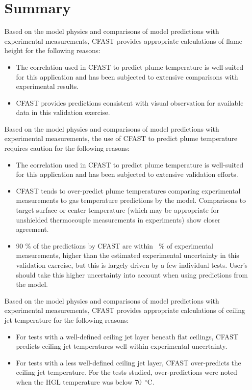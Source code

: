 \section{Summary}

Based on the model physics and comparisons of model predictions with experimental measurements, CFAST provides appropriate calculations of flame height for the following reasons:

\begin{itemize}
\item The correlation used in CFAST to predict plume temperature is well-suited for this application and has been subjected to extensive comparisons with experimental results.
\item CFAST provides predictions consistent with visual observation for available data in this validation exercise.
\end{itemize}

Based on the model physics and comparisons of model predictions with experimental measurements, the use of CFAST to predict plume temperature requires caution for the following reasons:

\begin{itemize}
\item The correlation used in CFAST to predict plume temperature is well-suited for this application and has been subjected to extensive validation efforts.
\item CFAST tends to over-predict plume temperatures comparing experimental measurements to gas temperature predictions by the model.  Comparisons to target surface or center temperature (which may be appropriate for unshielded thermocouple measurements in experiments) show closer agreement.
\item 90 \% of the predictions by CFAST are within \Plumeavg~\% of experimental measurements, higher than the estimated experimental uncertainty in this validation exercise, but this is largely driven by a few individual tests.  User's should take this higher uncertainty into account when using predictions from the model.
\end{itemize}

Based on the model physics and comparisons of model predictions with experimental measurements, CFAST provides appropriate calculations of ceiling jet temperature for the following reasons:
\begin{itemize}
\item For tests with a well-defined ceiling jet layer beneath flat ceilings, CFAST predicts ceiling jet temperatures well-within experimental uncertainty.
\item For tests with a less well-defined ceiling jet layer, CFAST over-predicts the ceiling jet temperature.  For the tests studied, over-predictions were noted when the HGL temperature was below 70~$^\circ$C.
\end{itemize}

